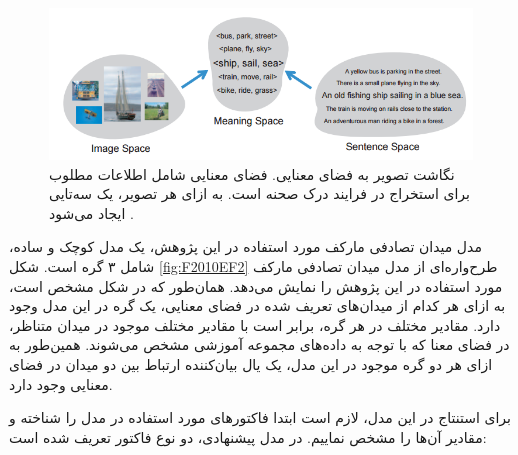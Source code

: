 \begin{figure}[h]
\center
\includegraphics[scale=0.7]{./Imgs/farhadi2010every_fig1.png}
\caption[نگاشت تصویر به فضای معنایی]{
نگاشت تصویر به فضای معنایی. فضای معنایی شامل اطلاعات مطلوب برای استخراج در فرایند درک صحنه است. به ازای هر تصویر، یک سه‌تایی ایجاد می‌شود
\cite{Farhadi2010every}.
}
\label{fig:F2010EF1}
\end{figure}

مدل میدان تصادفی مارکف مورد استفاده در این پژوهش، یک مدل کوچک و ساده، شامل ۳ گره است. شکل \ref{fig:F2010EF2}
طرح‌واره‌ای از مدل میدان تصادفی مارکف مورد استفاده در این پژوهش را نمایش می‌دهد. همان‌طور که در شکل مشخص است،  به ازای هر کدام از میدان‌های تعریف شده در فضای معنایی، یک گره در این مدل وجود دارد. مقادیر مختلف در هر گره، برابر است با مقادیر مختلف موجود در میدان متناظر، در فضای معنا که با توجه به داده‌های مجموعه‌‌ ‌آموزشی مشخص می‌شوند. همین‌طور به ازای هر دو گره موجود در این مدل، یک یال بیان‌کننده ارتباط بین دو میدان در فضای معنایی وجود دارد.

برای استنتاج در این مدل، لازم است ابتدا فاکتور‌های مورد استفاده در مدل را شناخته و مقادیر آن‌ها را مشخص نماییم. در مدل پیشنهادی، دو نوع فاکتور تعریف شده است:

